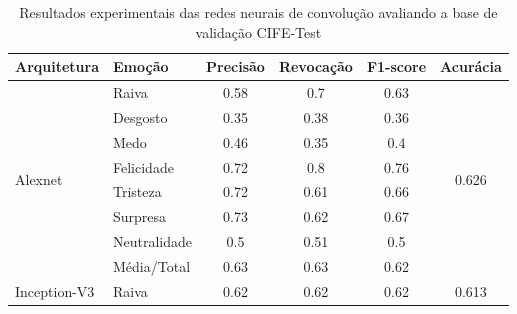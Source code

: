 

\begin{table}[]
\centering
\caption{Resultados experimentais das redes neurais de convolução avaliando a base de validação CIFE-Test}
\label{table:cife-test}
\begin{tabular}{llcccc}
\hline
\textbf{Arquitetura}                   & \textbf{Emoção}       & \textbf{Precisão} & \textbf{Revocação} & \textbf{F1-score} & \textbf{Acurácia}               \\ \hline
\multirow{8}{*}{Alexnet}         & Raiva                 & 0.58              & 0.7                & 0.63              & \multirow{8}{*}{0.626}          \\
                                       & Desgosto              & 0.35              & 0.38               & 0.36              &                                 \\
                                       & Medo                  & 0.46              & 0.35               & 0.4               &                                 \\
                                       & Felicidade            & 0.72              & 0.8                & 0.76              &                                 \\
                                       & Tristeza              & 0.72              & 0.61               & 0.66              &                                 \\
                                       & Surpresa              & 0.73              & 0.62               & 0.67              &                                 \\
                                       & Neutralidade          & 0.5               & 0.51               & 0.5               &                                 \\
                                       & Média/Total           & 0.63              & 0.63               & 0.62              &                                 \\ \hline
\multirow{8}{*}{Inception-V3}     & Raiva                 & 0.62              & 0.62               & 0.62              & \multirow{8}{*}{0.613}          \\

\end{tabular}
\end{table}
